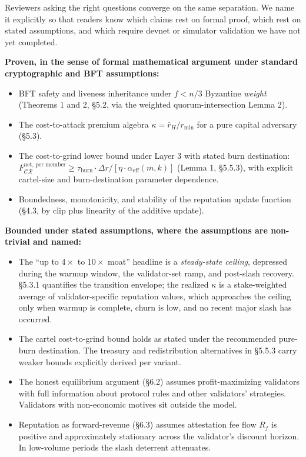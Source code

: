 \documentclass[
  11pt,
]{article}
\providecommand{\tightlist}{%
  \setlength{\itemsep}{0pt}\setlength{\parskip}{0pt}}
\begin{document}
Reviewers asking the right questions converge on the same separation. We
name it explicitly so that readers know which claims rest on formal
proof, which rest on stated assumptions, and which require devnet or
simulator validation we have not yet completed.

\textbf{Proven, in the sense of formal mathematical argument under
standard cryptographic and BFT assumptions:}

\begin{itemize}
\tightlist
\item
  BFT safety and liveness inheritance under \(f < n/3\) Byzantine
  \emph{weight} (Theorems 1 and 2, §5.2, via the weighted
  quorum-intersection Lemma 2).
\item
  The cost-to-attack premium algebra \(\kappa = \bar{r}_H / r_{\min}\)
  for a pure capital adversary (§5.3).
\item
  The cost-to-grind lower bound under Layer 3 with stated burn
  destination:
  \(F^{\text{net, per member}}_{\mathcal{CR}} \geq \tau_{\text{burn}} \cdot \Delta r / [\eta \cdot \alpha_{\text{eff}}(m, k)]\)
  (Lemma 1, §5.5.3), with explicit cartel-size and burn-destination
  parameter dependence.
\item
  Boundedness, monotonicity, and stability of the reputation update
  function (§4.3, by clip plus linearity of the additive update).
\end{itemize}

\textbf{Bounded under stated assumptions, where the assumptions are
non-trivial and named:}

\begin{itemize}
\tightlist
\item
  The ``up to \(4\times\) to \(10\times\) moat'' headline is a
  \emph{steady-state ceiling}, depressed during the warmup window, the
  validator-set ramp, and post-slash recovery. §5.3.1 quantifies the
  transition envelope; the realized \(\kappa\) is a stake-weighted
  average of validator-specific reputation values, which approaches the
  ceiling only when warmup is complete, churn is low, and no recent
  major slash has occurred.
\item
  The cartel cost-to-grind bound holds as stated under the recommended
  pure-burn destination. The treasury and redistribution alternatives in
  §5.5.3 carry weaker bounds explicitly derived per variant.
\item
  The honest equilibrium argument (§6.2) assumes profit-maximizing
  validators with full information about protocol rules and other
  validators' strategies. Validators with non-economic motives sit
  outside the model.
\item
  Reputation as forward-revenue (§6.3) assumes attestation fee flow
  \(R_f\) is positive and approximately stationary across the
  validator's discount horizon. In low-volume periods the slash
  deterrent attenuates.
\end{itemize}
\end{document}
